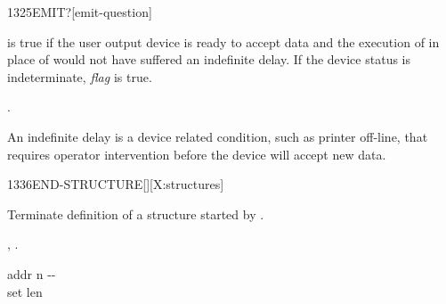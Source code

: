 \begin{worddef}[EMITq]{1325}{EMIT?}[emit-question]
\item {}

	 is true if the user output device is ready to
	accept data and the execution of  in place of
	 would not have suffered an indefinite delay. If
	the device status is indeterminate, \emph{flag} is true.

\see {}.

	\begin{rationale} %
		An indefinite delay is a device related condition, such as
		printer off-line, that requires operator intervention before
		the device will accept new data.
	\end{rationale}
\end{worddef}

\enlargethispage{2ex}
\begin{worddef}{1336}{END-STRUCTURE}[][X:structures]
\item {}

	Terminate definition of a structure started by
	.

\see {},
	.

	\begin{implement} %

		\word{:} \tab{} addr n -{}- \\
		\tab {} \word{!} \word{;} \tab[4.2] set len
	\end{implement}
\end{worddef}



